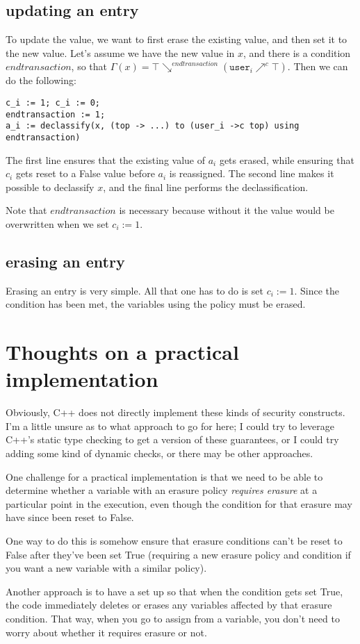 \documentclass[11pt, oneside]{article}   	%
\begin{document}
\subsection{updating an entry}
To update the value, we want to first erase the existing value, and then set it to the new value. Let's assume we have the new value in $x$, and there is a condition $\mathit{endtransaction}$, so that $\Gamma(x) = \top\searrow^{\mathit{endtransaction}}(\texttt{user}_i\nearrow^c\top)$.
Then we can do the following:
\begin{lstlisting}
c_i := 1; c_i := 0;
endtransaction := 1;
a_i := declassify(x, (top -> ...) to (user_i ->c top) using endtransaction)
\end{lstlisting}

The first line ensures that the existing value of $a_i$ gets erased, while ensuring that $c_i$ gets reset to a False value before $a_i$ is reassigned. The second line makes it possible to declassify $x$, and the final line performs the declassification.

Note that $\mathit{endtransaction}$ is necessary because without it the value would be overwritten when we set $c_i := 1$.

\subsection{erasing an entry}
Erasing an entry is very simple. All that one has to do is set $c_i := 1$. Since the condition has been met, the variables using the policy must be erased.

\section{Thoughts on a practical implementation}

Obviously, C++ does not directly implement these kinds of security constructs. I'm a little unsure as to what approach to go for here; I could try to leverage C++'s static type checking to get a version of these guarantees, or I could try adding some kind of dynamic checks, or there may be other approaches.

One challenge for a practical implementation is that we need to be able to determine whether a variable with an erasure policy \emph{requires erasure} at a particular point in the execution, even though the condition for that erasure may have since been reset to False.

One way to do this is somehow ensure that erasure conditions can't be reset to False after they've been set True (requiring a new erasure policy and condition if you want a new variable with a similar policy).

Another approach is to have a set up so that when the condition gets set True, the code immediately deletes or erases any variables affected by that erasure condition. That way, when you go to assign from a variable, you don't need to worry about whether it requires erasure or not.
\end{document}
